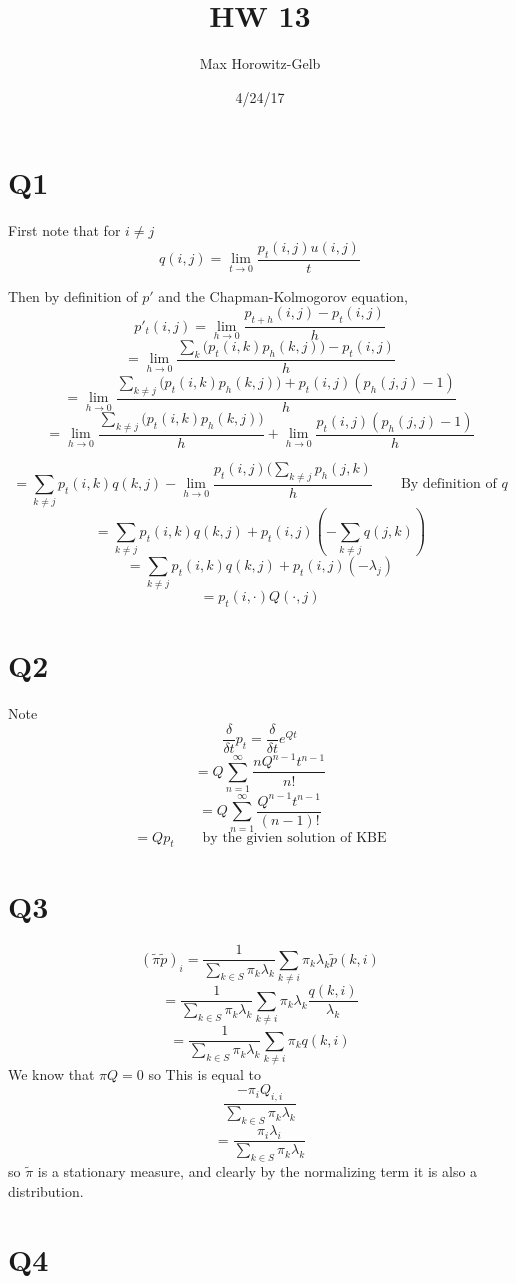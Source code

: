 \documentclass{article}
\title{HW 13}
\date{4/24/17}
\author{Max Horowitz-Gelb}
\begin{document}
\maketitle

\section*{Q1}
First note that for $i \neq j$
$$
q(i,j) = \lim_{t \to 0} \frac{p_t(i,j) u(i,j)}{t}
$$


Then by definition of $p'$ and the Chapman-Kolmogorov equation,
$$
p'_t(i,j) =  \lim_{h \to 0} \frac{p_{t+h}(i,j) - p_t(i,j)}{h}
$$
$$
= \lim_{h \to 0} \frac{\sum_{k} \big(p_t(i,k) p_h(k,j)\big) - p_t(i,j)}{h}
$$
$$
= \lim_{h \to 0} \frac{\sum_{k\neq j} \big(p_t(i,k) p_h(k,j)\big) + p_t(i,j)(p_h(j,j)-1)}{h}
$$
$$
= \lim_{h \to 0} \frac{\sum_{k\neq j} \big(p_t(i,k) p_h(k,j)\big)}{h} + \lim_{h \to 0} \frac{p_t(i,j)(p_h(j,j)-1)}{h}
$$

$$
= \sum_{k\neq j} p_t(i,k) q(k,j) - \lim_{h \to 0} \frac{p_t(i,j)(\sum_{k\neq j} p_h(j,k)}{h}
\qquad \text{By definition of }q
$$
$$
= \sum_{k\neq j} p_t(i,k) q(k,j)  + p_t(i,j)(-\sum_{k\neq j} q(j,k))
$$
$$
= \sum_{k\neq j} p_t(i,k) q(k,j)  + p_t(i,j)(-\lambda_j)
$$
$$
= p_t(i,\cdot) Q(\cdot,j)
$$

\section*{Q2}
Note
$$
\frac{\delta}{\delta t} p_t = \frac{\delta}{\delta t} e^{Qt}
$$
$$
= Q \sum_{n=1} ^\infty \frac{n Q^{n-1} t^{n-1}}{n!}
$$
$$
= Q \sum_{n=1} ^\infty \frac{Q^{n-1} t^{n-1}}{(n-1)!} 
$$
$$
= Q p_t \qquad \text{by the givien solution of KBE}
$$

\section*{Q3}

$$
(\tilde{\pi}\tilde{p})_i = \frac{1}{\sum_{k\in S} \pi_k\lambda_k} \sum_{k \neq i} \pi_k \lambda_k \tilde{p}(k,i)
$$
$$
= \frac{1}{\sum_{k\in S} \pi_k\lambda_k} \sum_{k \neq i} \pi_k \lambda_k \frac{q(k,i)}{\lambda_k}
$$
$$
= \frac{1}{\sum_{k\in S} \pi_k\lambda_k} \sum_{k \neq i} \pi_k q(k,i)
$$
We know that $\pi Q = 0$ so This is equal to 
$$
\frac{-\pi_i Q_{i,i}}{\sum_{k\in S} \pi_k\lambda_k} 
$$
$$
= \frac{\pi_i \lambda_i}{\sum_{k\in S} \pi_k\lambda_k} 
$$
so $\tilde{\pi}$ is a stationary measure, and clearly by the normalizing term it is also a distribution.

\section*{Q4}
\end{document}
